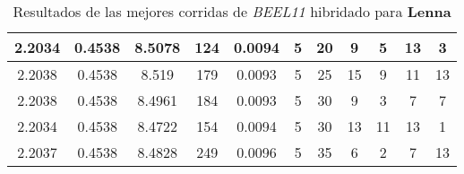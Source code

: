 \begin{table}[h!]
\begin{center}
\begin{tabular}{|c|c|c|c|c|c|c|c|c|c|c|}
        \hline
        \hline
            2.2034 & 0.4538  & 8.5078 & 124 & 0.0094 & 5 & 20 & 9 & 5 & 13 & 3\\
        \hline
        \hline
            2.2038 & 0.4538  & 8.519 & 179 & 0.0093 & 5 & 25 & 15 & 9 & 11 & 13\\
        \hline
        \hline
            2.2038 & 0.4538  & 8.4961 & 184 & 0.0093 & 5 & 30 & 9 & 3 & 7 & 7\\
        \hline
        \hline
            2.2034 & 0.4538  & 8.4722 & 154 & 0.0094 & 5 & 30 & 13 & 11 & 13 & 1\\
        \hline
        \hline
            2.2037 & 0.4538  & 8.4828 & 249 & 0.0096 & 5 & 35 & 6 & 2 & 7 & 13\\
        \hline
        \end{tabular}
        \caption{Resultados de las mejores corridas de \emph{BEEL11} hibridado para {\bf Lenna}}
        \label{tb:tableBEEL11}
    \end{center}
\end{table}
